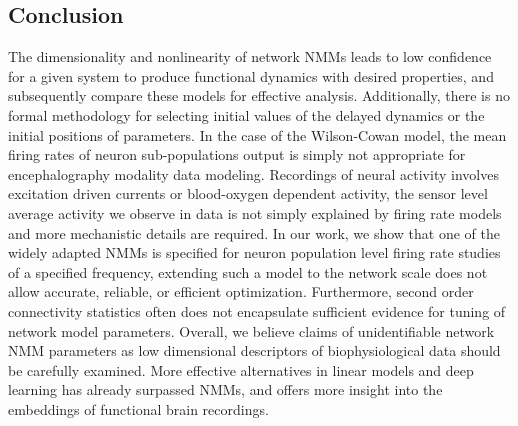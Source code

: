 \subsection{Conclusion}
The dimensionality and nonlinearity of network NMMs leads to low confidence for a given system to produce functional dynamics with desired properties, and subsequently compare these models for effective analysis. Additionally, there is no formal methodology for selecting initial values of the delayed dynamics or the initial positions of parameters. In the case of the Wilson-Cowan model, the mean firing rates of neuron sub-populations output is simply not appropriate for encephalography modality data modeling. Recordings of neural activity involves excitation driven currents or blood-oxygen dependent activity, the sensor level average activity we observe in data is not simply explained by firing rate models and more mechanistic details are required. In our work, we show that one of the widely adapted NMMs is specified for neuron population level firing rate studies of a specified frequency, extending such a model to the network scale does not allow accurate, reliable, or efficient optimization. Furthermore, second order connectivity statistics often does not encapsulate sufficient evidence for tuning of network model parameters. Overall, we believe claims of unidentifiable network NMM parameters as low dimensional descriptors of biophysiological data should be carefully examined. More effective alternatives in linear models and deep learning has already surpassed NMMs, and offers more insight into the embeddings of functional brain recordings.